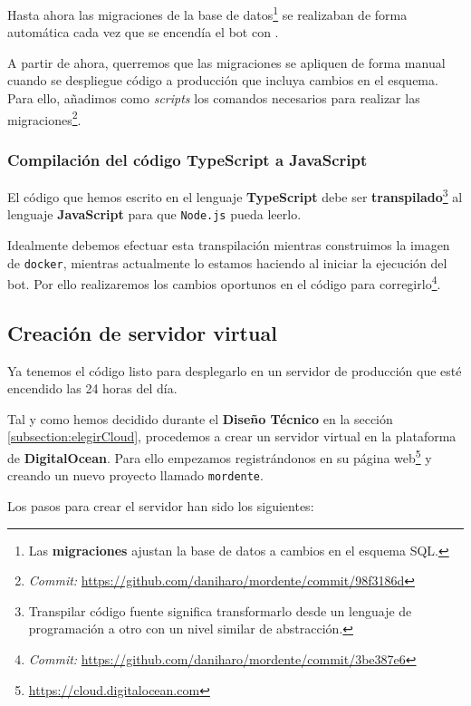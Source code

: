 Hasta ahora las migraciones de la base de datos\footnote{Las \textbf{migraciones} ajustan la base de datos a cambios en el esquema SQL.} se realizaban de forma automática cada vez que se encendía el bot con .

A partir de ahora, querremos que las migraciones se apliquen de forma manual cuando se despliegue código a producción que incluya cambios en el esquema. Para ello, añadimos como \textit{scripts} los comandos necesarios para realizar las migraciones\footnote{\textit{Commit:} \url{https://github.com/daniharo/mordente/commit/98f3186d}}.


\subsubsection{Compilación del código TypeScript a JavaScript}

El código que hemos escrito en el lenguaje \textbf{TypeScript} debe ser \textbf{transpilado}\footnote{Transpilar código fuente significa transformarlo desde un lenguaje de programación a otro con un nivel similar de abstracción\cite{whatIsTranspiler}.} al lenguaje \textbf{JavaScript} para que \texttt{Node.js} pueda leerlo.

Idealmente debemos efectuar esta transpilación mientras construimos la imagen de \texttt{docker}, mientras actualmente lo estamos haciendo al iniciar la ejecución del bot. Por ello realizaremos los cambios oportunos en el código para corregirlo\footnote{\textit{Commit:} \url{https://github.com/daniharo/mordente/commit/3be387e6}}.


\subsection{Creación de servidor virtual}

Ya tenemos el código listo para desplegarlo en un servidor de producción que esté encendido las 24 horas del día.

Tal y como hemos decidido durante el \textbf{Diseño Técnico} en la sección \ref{subsection:elegirCloud}, procedemos a crear un servidor virtual en la plataforma de \textbf{DigitalOcean}. Para ello empezamos registrándonos en su página web\footnote{\url{https://cloud.digitalocean.com}} y creando un nuevo proyecto llamado \texttt{mordente}.

Los pasos para crear el servidor han sido los siguientes:

